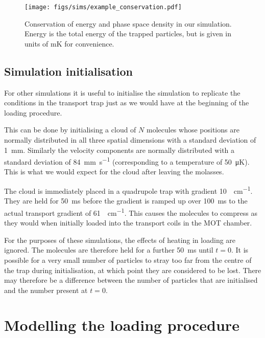 \begin{figure}
  \centering
  \texttt{[image: figs/sims/example\_conservation.pdf]}
  \caption{Conservation of energy and phase space density in our simulation.
  Energy is the total energy of the trapped particles, but is given in units of
  \si{\milli\kelvin} for convenience. 
  }
  \label{design:fig:conservation}
\end{figure}

\subsection{Simulation initialisation}

For other simulations it is useful to initialise the simulation to replicate
the conditions in the transport trap just as we would have at the beginning of
the loading procedure.

This can be done by initialising a cloud of $N$ molecules whose positions are
normally distributed in all three spatial dimensions with a standard deviation
of \SI{1}{\milli\meter}. Similarly the velocity components are normally
distributed with a standard deviation of \SI{84}{\milli\meter\per\second}
(corresponding to a temperature of \SI{50}{\micro\kelvin}). This is what we
would expect for the cloud after leaving the molasses.

The cloud is immediately placed in a quadrupole trap with gradient
\SI{10}{\gauss\per\centi\meter}. They are held for \SI{50}{\milli\second}
before the gradient is ramped up over \SI{100}{\milli\second} to the actual
transport gradient of \SI{61}{\gauss\per\centi\meter}. This causes the
molecules to compress as they would when initially loaded into the transport
coils in the MOT chamber.

For the purposes of these simulations, the effects of heating in loading
  are
ignored. The molecules are therefore held for a further \SI{50}{\milli\second}
until $t=0$. It is possible for a very small number of particles to stray too
far from the centre of the trap during initialisation, at which point they are
considered to be lost. There may therefore be a difference between the number
of particles that are initialised and the number present at $t=0$.

\section{Modelling the loading procedure}
\label{design:sim}

